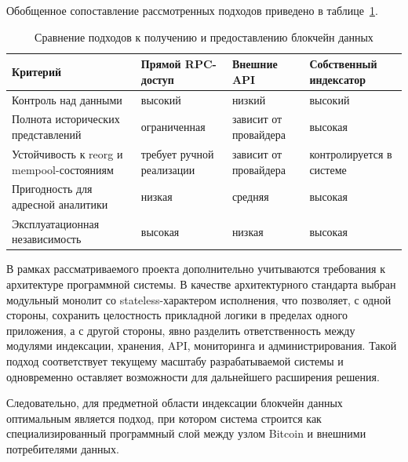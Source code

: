 Обобщенное сопоставление рассмотренных подходов приведено в
таблице~\ref{tab:indexing-approaches}.

\begin{table}
    \caption{Сравнение подходов к получению и предоставлению блокчейн данных}
    \begin{tabular}{|p{}|p{}|p{}|p{}|}\hline
    Критерий & Прямой RPC-доступ & Внешние API & Собственный индексатор \\ \hline
    Контроль над данными & высокий & низкий & высокий \\ \hline
    Полнота исторических представлений & ограниченная & зависит от провайдера & высокая \\ \hline
    Устойчивость к reorg и mempool-состояниям & требует ручной реализации & зависит от провайдера & контролируется в системе \\ \hline
    Пригодность для адресной аналитики & низкая & средняя & высокая \\ \hline
    Эксплуатационная независимость & высокая & низкая & высокая \\ \hline
    \end{tabular}
    \label{tab:indexing-approaches}
\end{table}

В рамках рассматриваемого проекта дополнительно учитываются требования к
архитектуре программной системы. В качестве архитектурного стандарта выбран
модульный монолит со stateless-характером исполнения, что позволяет, с одной
стороны, сохранить целостность прикладной логики в пределах одного приложения,
а с другой стороны,
явно разделить ответственность между модулями индексации, хранения, API,
мониторинга и администрирования. Такой подход соответствует текущему масштабу
разрабатываемой системы и одновременно оставляет возможности для дальнейшего
расширения решения.

Следовательно, для предметной области индексации блокчейн данных оптимальным
является подход, при котором система строится как специализированный программный
слой между узлом Bitcoin и внешними потребителями данных.
